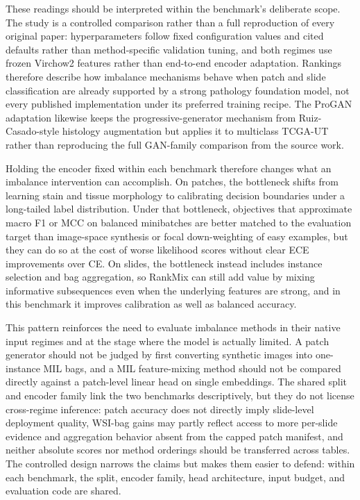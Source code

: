 \documentclass[11pt]{article}
\begin{document}
These readings should be interpreted within the benchmark's deliberate scope. The study is a controlled comparison rather than a full reproduction of every original paper: hyperparameters follow fixed configuration values and cited defaults rather than method-specific validation tuning, and both regimes use frozen Virchow2 features rather than end-to-end encoder adaptation. Rankings therefore describe how imbalance mechanisms behave when patch and slide classification are already supported by a strong pathology foundation model, not every published implementation under its preferred training recipe. The ProGAN adaptation likewise keeps the progressive-generator mechanism from Ruiz-Casado-style histology augmentation but applies it to multiclass TCGA-UT rather than reproducing the full GAN-family comparison from the source work.

Holding the encoder fixed within each benchmark therefore changes what an imbalance intervention can accomplish. On patches, the bottleneck shifts from learning stain and tissue morphology to calibrating decision boundaries under a long-tailed label distribution. Under that bottleneck, objectives that approximate macro F1 or MCC on balanced minibatches are better matched to the evaluation target than image-space synthesis or focal down-weighting of easy examples, but they can do so at the cost of worse likelihood scores without clear ECE improvements over CE. On slides, the bottleneck instead includes instance selection and bag aggregation, so RankMix can still add value by mixing informative subsequences even when the underlying features are strong, and in this benchmark it improves calibration as well as balanced accuracy.

This pattern reinforces the need to evaluate imbalance methods in their native input regimes and at the stage where the model is actually limited. A patch generator should not be judged by first converting synthetic images into one-instance MIL bags, and a MIL feature-mixing method should not be compared directly against a patch-level linear head on single embeddings. The shared split and encoder family link the two benchmarks descriptively, but they do not license cross-regime inference: patch accuracy does not directly imply slide-level deployment quality, WSI-bag gains may partly reflect access to more per-slide evidence and aggregation behavior absent from the capped patch manifest, and neither absolute scores nor method orderings should be transferred across tables. The controlled design narrows the claims but makes them easier to defend: within each benchmark, the split, encoder family, head architecture, input budget, and evaluation code are shared.
\end{document}
